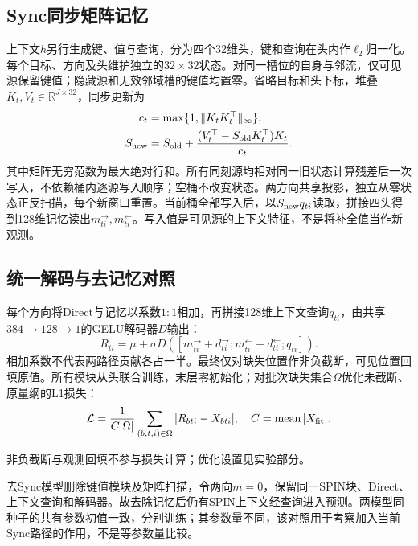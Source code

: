 \subsection{Sync同步矩阵记忆}
上下文$h$另行生成键、值与查询，分为四个32维头，键和查询在头内作$\ell_2$归一化。每个目标、方向及头维护独立的$32\times32$状态。对同一槽位的自身与邻流，仅可见源保留键值；隐藏源和无效邻域槽的键值均置零。省略目标和头下标，堆叠$K_t,V_t\in\mathbb R^{J\times32}$，同步更新为
\begin{equation}
 \begin{aligned}
 c_t&=\max\{1,\|K_tK_t^\top\|_\infty\},\\
 S_{\rm new}&=S_{\rm old}
 +\frac{(V_t^\top-S_{\rm old}K_t^\top)K_t}{c_t}.
 \end{aligned}
 \label{eq:sync-update}
\end{equation}
其中矩阵无穷范数为最大绝对行和。所有同刻源均相对同一旧状态计算残差后一次写入，不依赖桶内逐源写入顺序；空桶不改变状态。两方向共享投影，独立从零状态正反扫描，每个新窗口重置。当前桶全部写入后，以$S_{\rm new}q_{ti}$读取，拼接四头得到128维记忆读出$m^{\rightarrow}_{ti},m^{\leftarrow}_{ti}$。写入值是可见源的上下文特征，不是将补全值当作新观测。

\subsection{统一解码与去记忆对照}
每个方向将Direct与记忆以系数$1{:}1$相加，再拼接128维上下文查询$q_{ti}$，由共享$384\to128\to1$的GELU解码器$D$输出：
\begin{equation}
 R_{ti}=\mu+\sigma D\!\left(
 [m^{\rightarrow}_{ti}+d^{\rightarrow}_{ti};
 m^{\leftarrow}_{ti}+d^{\leftarrow}_{ti};q_{ti}]
 \right).
 \label{eq:unified-decoder}
\end{equation}
相加系数不代表两路径贡献各占一半。最终仅对缺失位置作非负截断，可见位置回填原值。所有模块从头联合训练，末层零初始化；对批次缺失集合$\Omega$优化未截断、原量纲的L1损失：
\begin{equation}
 \mathcal L=\frac{1}{C|\Omega|}\sum_{(b,t,i)\in\Omega}|R_{bti}-X_{bti}|,
 \quad C=\operatorname{mean}|X_{\rm fit}|.
 \label{eq:missing-loss}
\end{equation}

非负截断与观测回填不参与损失计算；优化设置见实验部分。

去Sync模型\lite{}删除键值模块及矩阵扫描，令两向$m=0$，保留同一SPIN块、Direct、上下文查询和解码器。故去除记忆后仍有SPIN上下文经查询进入预测。两模型同种子的共有参数初值一致，分别训练；其参数量不同，该对照用于考察加入当前Sync路径的作用，不是等参数量比较。
